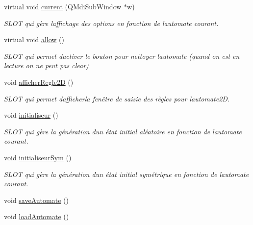 \begin{DoxyCompactItemize}
virtual void \hyperlink{class_main_window_a83229b428a4774bf75bebfb6a1ae2bfe}{current} (Q\+Mdi\+Sub\+Window $\ast$w)
\begin{DoxyCompactList}\small\item\em S\+L\+OT qui gère l\textquotesingle{}affichage des options en fonction de l\textquotesingle{}automate courant. \end{DoxyCompactList}\item 
virtual void \hyperlink{class_main_window_a9a12b2903cb870b374af5f0ab8df7bda}{allow} ()
\begin{DoxyCompactList}\small\item\em S\+L\+OT qui permet d\textquotesingle{}activer le bouton pour nettoyer l\textquotesingle{}automate (quand on est en lecture on ne peut pas clear) \end{DoxyCompactList}\item 
void \hyperlink{class_main_window_ab14d52a2b2a63b6ed930e4131322dd3d}{afficher\+Regle2D} ()
\begin{DoxyCompactList}\small\item\em S\+L\+OT qui permet d\textquotesingle{}afficherla fenêtre de saisie des règles pour l\textquotesingle{}automate2D. \end{DoxyCompactList}\item 
void \hyperlink{class_main_window_a2ee1589220ee377441d94777ccef6c9f}{initialiseur} ()
\begin{DoxyCompactList}\small\item\em S\+L\+OT qui gère la génération d\textquotesingle{}un état initial aléatoire en fonction de l\textquotesingle{}automate courant. \end{DoxyCompactList}\item 
void \hyperlink{class_main_window_a611ef20ef8820089fe62ea686f321456}{initialiseur\+Sym} ()
\begin{DoxyCompactList}\small\item\em S\+L\+OT qui gère la génération d\textquotesingle{}un état initial symétrique en fonction de l\textquotesingle{}automate courant. \end{DoxyCompactList}\item 
void \hyperlink{class_main_window_a4106cf25ea9980d703e04bac7c9ecd31}{save\+Automate} ()
\item 
void \hyperlink{class_main_window_ad9bd4644e729ca73c06d51378aa05753}{load\+Automate} ()
\end{DoxyCompactItemize}
